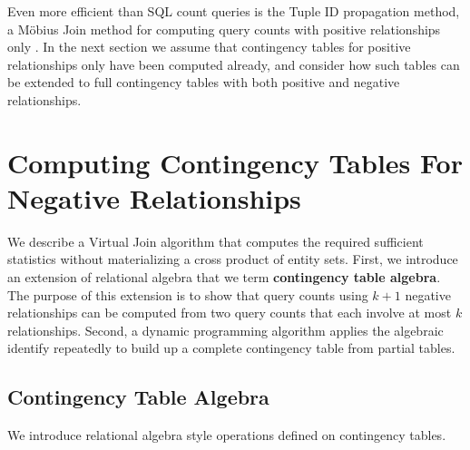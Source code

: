 \documentclass{acm_proc_article-sp}
\begin{document}
Even more efficient than SQL count queries is the Tuple ID propagation method, a M\"obius Join method for computing query counts with positive relationships only \cite{Yin2004}. 
In the next section we assume that contingency tables for positive relationships only have been computed already, and consider how such tables can be extended to full contingency tables with both positive and negative relationships.




\section{Computing Contingency Tables For Negative Relationships} 

We describe a Virtual Join algorithm that computes the required sufficient statistics without  materializing a cross product of entity sets. 
First, we introduce an  extension of relational algebra that we term \textbf{contingency table algebra}. The purpose of this extension is to 
show that query counts using $k+1$ negative relationships can be computed from two query counts that each involve at most $k$ relationships. 
Second, a dynamic programming algorithm applies the algebraic identify repeatedly to build up a complete contingency table from partial tables.

\subsection{Contingency Table Algebra} \label{sec:cta}
We introduce relational algebra style operations defined on contingency tables.
\end{document}
